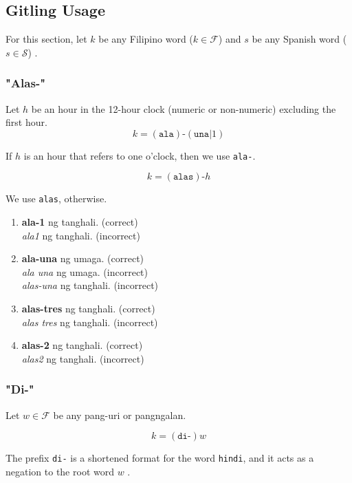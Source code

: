\subsection{Gitling Usage}
\label{gitling_usage}
For this section, let $k$ be any Filipino word (\(k\in\mathcal{F}\)) and $s$ be any Spanish word (\(s\in\mathcal{S}\)) \cite{Balarila}.

\subsubsection{"Alas-"}

Let \(h\) be an hour in the 12-hour clock (numeric or non-numeric) excluding the first hour.
\[
      k = (\texttt{ala})\texttt{-}(\texttt{una} | 1)
\]

If $h$ is an hour that refers to one o'clock, then we use \texttt{ala-}.

\[
      k = (\texttt{alas})\texttt{-}h
\]

We use \texttt{alas}, otherwise.

\begin{example}
\end{example}
\begin{enumerate}
      \item \textbf{ala-1} ng tanghali. (correct) \\
            \textit{ala1} ng tanghali. (incorrect)
      \item \textbf{ala-una} ng umaga. (correct) \\
            \textit{ala una} ng umaga. (incorrect) \\
            \textit{alas-una} ng tanghali. (incorrect)
      \item \textbf{alas-tres} ng tanghali. (correct) \\
            \textit{alas tres} ng tanghali. (incorrect)
      \item \textbf{alas-2} ng tanghali. (correct) \\
            \textit{alas2} ng tanghali. (incorrect)
\end{enumerate}

\subsubsection{"Di-"}

Let $w\in\mathcal{F}$ be any pang-uri or pangngalan.

\[
      k = (\texttt{di-})w
\]

The prefix \texttt{di-} is a shortened format for the word \texttt{hindi}, and it acts as a negation to the root word $w$ \cite{Balarila}.

